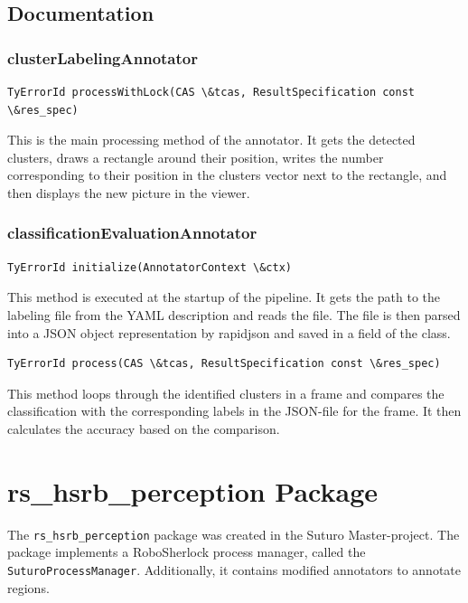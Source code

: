 \documentclass[main.tex]{subfiles}
\begin{document}
\subsection{Documentation}
\subsubsection{clusterLabelingAnnotator}
\begin{lstlisting}
TyErrorId processWithLock(CAS \&tcas, ResultSpecification const \&res_spec)
\end{lstlisting}
This is the main processing method of the annotator. It gets the detected clusters, draws a rectangle around their position, writes the number corresponding to their position in the clusters vector next to the rectangle, and then displays the new picture in the viewer.


\subsubsection{classificationEvaluationAnnotator}
\begin{lstlisting}
TyErrorId initialize(AnnotatorContext \&ctx)
\end{lstlisting}

This method is executed at the startup of the pipeline.  It gets the path to the labeling file from the YAML description and reads the file. The file is then parsed into a JSON object representation by rapidjson and saved in a field of the class.

\begin{lstlisting}
TyErrorId process(CAS \&tcas, ResultSpecification const \&res_spec)
\end{lstlisting}

This method loops through the identified clusters in a frame and compares the classification with the corresponding labels in the JSON-file for the frame. It then calculates the accuracy based on the comparison.



\section{rs\_hsrb\_perception Package}

The \texttt{rs\_hsrb\_perception} package was created in the Suturo Master-project. The package implements a RoboSherlock process manager, called the \texttt{SuturoProcessManager}. Additionally, it contains modified annotators to annotate regions.
\end{document}
